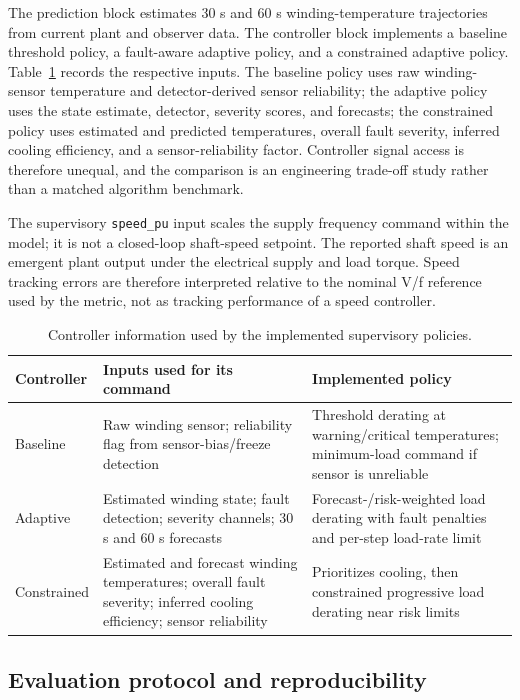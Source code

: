 \documentclass[machines,article,submit,moreauthors]{Definitions/mdpi}
\begin{document}
The prediction block estimates 30 s and 60 s winding-temperature trajectories from current plant and observer data. The controller block implements a baseline threshold policy, a fault-aware adaptive policy, and a constrained adaptive policy. Table~\ref{tab:controllerinfo} records the respective inputs. The baseline policy uses raw winding-sensor temperature and detector-derived sensor reliability; the adaptive policy uses the state estimate, detector, severity scores, and forecasts; the constrained policy uses estimated and predicted temperatures, overall fault severity, inferred cooling efficiency, and a sensor-reliability factor. Controller signal access is therefore unequal, and the comparison is an engineering trade-off study rather than a matched algorithm benchmark.

The supervisory \texttt{speed\_pu} input scales the supply frequency command within the model; it is not a closed-loop shaft-speed setpoint. The reported shaft speed is an emergent plant output under the electrical supply and load torque. Speed tracking errors are therefore interpreted relative to the nominal V/f reference used by the metric, not as tracking performance of a speed controller.

\begin{table}[H]
\caption{Controller information used by the implemented supervisory policies.\label{tab:controllerinfo}}
\begin{tabularx}{\textwidth}{l X X}
\toprule
\textbf{Controller} & \textbf{Inputs used for its command} & \textbf{Implemented policy} \\
\midrule
Baseline & Raw winding sensor; reliability flag from sensor-bias/freeze detection & Threshold derating at warning/critical temperatures; minimum-load command if sensor is unreliable \\
Adaptive & Estimated winding state; fault detection; severity channels; 30 s and 60 s forecasts & Forecast-/risk-weighted load derating with fault penalties and per-step load-rate limit \\
Constrained & Estimated and forecast winding temperatures; overall fault severity; inferred cooling efficiency; sensor reliability & Prioritizes cooling, then constrained progressive load derating near risk limits \\
\bottomrule
\end{tabularx}
\end{table}

\subsection{Evaluation protocol and reproducibility}
\end{document}

